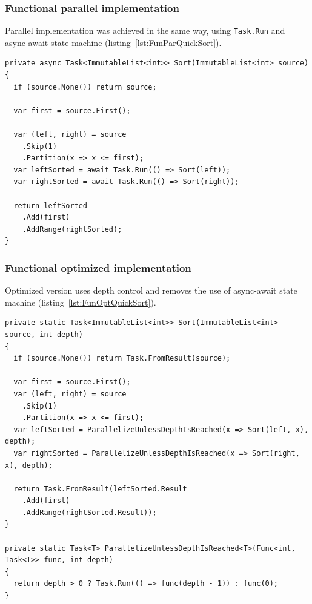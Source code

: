 \subsubsection{Functional parallel implementation}
Parallel implementation was achieved in the same way, using \texttt{Task.Run} and async-await state machine 
(listing~\ref{lst:FunParQuickSort}).
\begin{lstlisting}[language={[sharp]c}, style=sharpcstyle, caption={Functional parallel \texttt{quicksort}}, label={lst:FunParQuickSort},
numbers=none, xleftmargin=0pt,framexleftmargin=0pt,framexrightmargin=0pt,framexbottommargin=0pt]
private async Task<ImmutableList<int>> Sort(ImmutableList<int> source)
{
  if (source.None()) return source;

  var first = source.First();
  
  var (left, right) = source
    .Skip(1)
    .Partition(x => x <= first);
  var leftSorted = await Task.Run(() => Sort(left));
  var rightSorted = await Task.Run(() => Sort(right));

  return leftSorted
    .Add(first)
    .AddRange(rightSorted);
}
\end{lstlisting}

\subsubsection{Functional optimized implementation}
Optimized version uses depth control and removes the use of async-await state machine (listing~\ref{lst:FunOptQuickSort}).
\begin{lstlisting}[language={[sharp]c}, style=sharpcstyle, caption={Functional optimized \texttt{quicksor}t}, label={lst:FunOptQuickSort},
numbers=none, xleftmargin=0pt,framexleftmargin=0pt,framexrightmargin=0pt,framexbottommargin=0pt]
private static Task<ImmutableList<int>> Sort(ImmutableList<int> source, int depth)
{
  if (source.None()) return Task.FromResult(source);

  var first = source.First();
  var (left, right) = source
    .Skip(1)
    .Partition(x => x <= first);
  var leftSorted = ParallelizeUnlessDepthIsReached(x => Sort(left, x), depth);
  var rightSorted = ParallelizeUnlessDepthIsReached(x => Sort(right, x), depth);

  return Task.FromResult(leftSorted.Result
    .Add(first)
    .AddRange(rightSorted.Result));
}

private static Task<T> ParallelizeUnlessDepthIsReached<T>(Func<int, Task<T>> func, int depth)
{
  return depth > 0 ? Task.Run(() => func(depth - 1)) : func(0);
}
\end{lstlisting}



